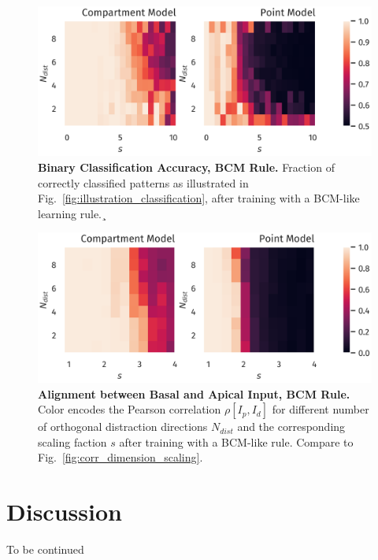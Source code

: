 \documentclass[10pt,a4paper,twocolumn]{article}
\begin{document}
		\begin{figure}
			\includegraphics[width=\columnwidth]{classification_dimension_scaling_bcm}
			\caption{{\bf Binary Classification Accuracy, BCM Rule.}
				Fraction of correctly classified patterns as illustrated in
				Fig.~\ref{fig:illustration_classification}, after training with
				a BCM-like learning rule.¸}
			\label{fig:classification_accuracy_bcm}
		\end{figure}
		
		\begin{figure}
			\includegraphics[width=\columnwidth]{corr_dimension_scaling_bcm}
			\caption{{\bf Alignment between Basal and Apical Input, BCM Rule.}
				Color encodes the Pearson correlation $\rho[I_p,I_d]$ for different
				number of orthogonal distraction directions $N_{dist}$ 
				and the corresponding scaling faction $s$ after training
				with a BCM-like rule. Compare to Fig.~\ref{fig:corr_dimension_scaling}.}
			\label{fig:corr_dimension_scaling_bcm}
		\end{figure}
		
		\section{Discussion}
		
		To be continued
		
		
		
		
\end{document}

